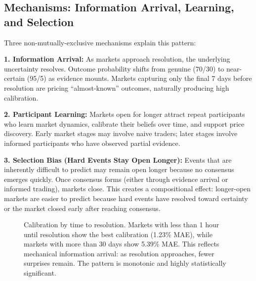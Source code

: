 \documentclass[12pt,letterpaper]{article}
\begin{document}
\subsection{Mechanisms: Information Arrival, Learning, and Selection}

Three non-mutually-exclusive mechanisms explain this pattern:

\textbf{1. Information Arrival:} As markets approach resolution, the underlying uncertainty resolves. Outcome probability shifts from genuine (70/30) to near-certain (95/5) as evidence mounts. Markets capturing only the final 7 days before resolution are pricing ``almost-known'' outcomes, naturally producing high calibration.

\textbf{2. Participant Learning:} Markets open for longer attract repeat participants who learn market dynamics, calibrate their beliefs over time, and support price discovery. Early market stages may involve naive traders; later stages involve informed participants who have observed partial evidence.

\textbf{3. Selection Bias (Hard Events Stay Open Longer):} Events that are inherently difficult to predict may remain open longer because no consensus emerges quickly. Once consensus forms (either through evidence arrival or informed trading), markets close. This creates a compositional effect: longer-open markets are easier to predict because hard events have resolved toward certainty or the market closed early after reaching consensus.

\begin{figure}[ht]
\centering
{}
\caption{Calibration by time to resolution. Markets with less than 1 hour until resolution show the best calibration (1.23\% MAE), while markets with more than 30 days show 5.39\% MAE. This reflects mechanical information arrival: as resolution approaches, fewer surprises remain. The pattern is monotonic and highly statistically significant.}
\label{fig:time-resolution}
\end{figure}
\end{document}
